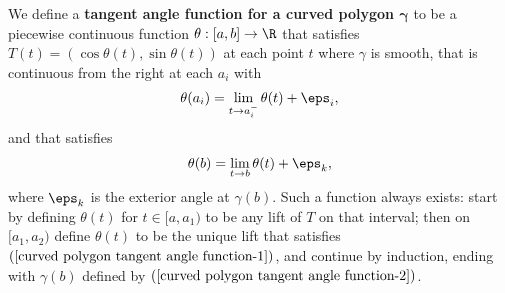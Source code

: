 We define a \textbf{tangent angle function for a curved polygon $\bm{\gamma}$} to be a piecewise continuous function $\theta:[a,b]\to\R$ that satisfies $T(t)=(\cos\theta(t),\sin\theta(t))$ 
at each point $t$ where $\gamma$ is smooth, that is continuous from the right at each $a_i$ with
\begin{align}\label{curved polygon tangent angle function-1}
\theta(a_i)=\lim_{t\to a_i^{-}}\theta(t)+\eps_i,
\end{align}
and that satisfies
\begin{align}\label{curved polygon tangent angle function-2}
\theta(b)=\lim_{t\to b}\theta(t)+\eps_k,
\end{align}
where $\eps_k$ is the exterior angle at $\gamma(b)$. Such a function always exists: start by defining $\theta(t)$ for $t\in[a,a_1)$ to be any lift of $T$ on that 
interval; then on $[a_1,a_2)$ define $\theta(t)$ to be the unique lift that satisfies $(\ref{curved polygon tangent angle function-1})$, and continue by induction, ending 
with $\gamma(b)$ defined by $(\ref{curved polygon tangent angle function-2})$.
